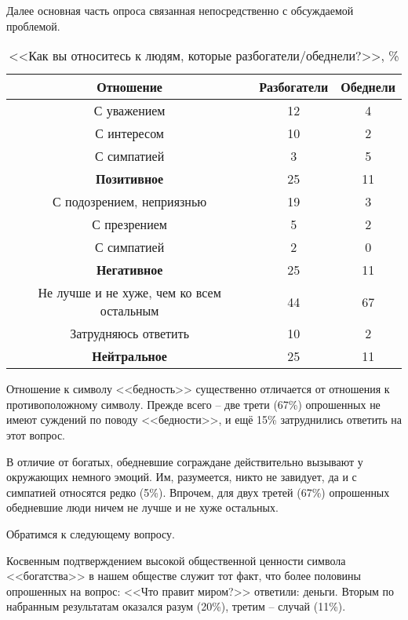 Далее основная часть опроса связанная непосредственно с обсуждаемой проблемой.
\begin{table}[h!]
    \centering
    \begin{tabular}{|c|c|c|}
        \hline
        Отношение & Разбогатели & Обеднели \\ \hline \hline
        С уважением & 12 & 4 \\ \hline
        С интересом & 10 & 2 \\ \hline
        С симпатией & 3 & 5 \\ \hline
        \textbf{Позитивное} & 25 & 11 \\ \hline \hline
        С подозрением, неприязнью & 19 & 3 \\ \hline
        С презрением & 5 & 2 \\ \hline
        С симпатией & 2 & 0 \\ \hline
        \textbf{Негативное} & 25 & 11 \\ \hline \hline
        Не лучше и не хуже, чем ко всем остальным & 44 & 67 \\ \hline
        Затрудняюсь ответить & 10 & 2 \\ \hline
        \textbf{Нейтральное} & 25 & 11 \\ \hline
    \end{tabular}
    \caption{<<Как вы относитесь к людям, которые разбогатели/обеднели?>>, \%}
\end{table}

Отношение к символу <<бедность>> существенно отличается от отношения к 
противоположному символу. Прежде всего -- две трети (67\%) опрошенных не 
имеют суждений по поводу <<бедности>>, и ещё 15\% затруднились ответить на 
этот вопрос. 

В отличие от богатых, обедневшие сограждане действительно вызывают у 
окружающих немного эмоций. Им, разумеется, никто не завидует, да и с симпатией 
относятся редко (5\%). Впрочем, для двух третей (67\%) опрошенных обедневшие 
люди ничем не лучше и не хуже остальных. 

Обратимся к следующему вопросу. 

Косвенным подтверждением высокой общественной ценности символа <<богатства>> в 
нашем обществе служит тот факт, что более половины опрошенных на вопрос: 
<<Что правит миром?>> ответили: деньги. Вторым по набранным результатам 
оказался разум (20\%), третим -- случай (11\%).

